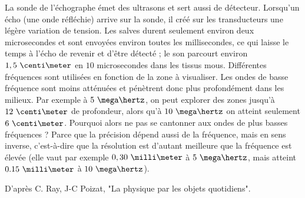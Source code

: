 La sonde de l'échographe émet des ultrasons et sert aussi de détecteur. Lorsqu'un écho (une onde réfléchie) arrive sur la sonde, il créé sur les transducteurs une légère variation de tension. Les salves durent seulement environ deux microsecondes et sont envoyées environ toutes les millisecondes, ce qui laisse le temps à l'écho de revenir et d'être détecté ; le son parcourt environ $1,5\text{ }\centi\meter$ en $10$ microsecondes dans les tissus mous.\newline
Différentes fréquences sont utilisées en fonction de la zone à visualiser. Les ondes de basse fréquence sont moins atténuées et pénètrent donc plus profondément dans les milieux. Par exemple à $5\text{ }\mega\hertz$, on peut explorer des zones jusqu'à $12\text{ }\centi\meter$ de profondeur, alors qu'à $10\text{ }\mega\hertz$ on atteint seulement $6\text{ }\centi\meter$. Pourquoi alors ne pas se cantonner aux ondes de plus basses fréquences ? Parce que la précision dépend aussi de la fréquence, mais en sens inverse, c'est-à-dire que la résolution est d'autant meilleure que la fréquence est élevée (elle vaut par exemple $0,30\text{ }\milli\meter$ à $5\text{ }\mega\hertz$, mais atteint $0.15\text{ }\milli\meter$ à $10\text{ }\mega\hertz$).

\vspace{0.3cm}

D'après C. Ray, J-C Poizat, "La physique par les objets quotidiens".

\vspace{0.3cm}

